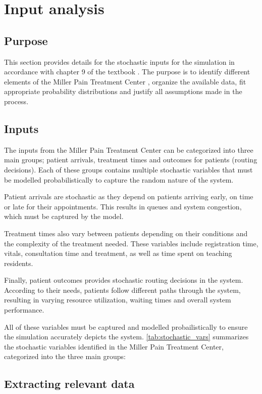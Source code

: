 \section{Input analysis}

\subsection{Purpose}
This section provides details for the stochastic inputs for the simulation in accordance with chapter 9 of the textbook \parencite{pensumbok}. The purpose is to identify different elements of the Miller Pain Treatment Center \parencite{MillerPainTreatmentCenter}, organize the available data, fit appropriate probability distributions and justify all assumptions made in the process.

\subsection{Inputs}
The inputs from the Miller Pain Treatment Center can be categorized into three main groups; patient arrivals, treatment times and outcomes for patients (routing decisions). Each of these groups contains multiple stochastic variables that must be modelled probabilistically to capture the random nature of the system.

Patient arrivals are stochastic as they depend on patients arriving early, on time or late for their appointments. This results in queues and system congestion, which must be captured by the model.

Treatment times also vary between patients depending on their conditions and the complexity of the treatment needed. These variables include registration time, vitals, consultation time and treatment, as well as time spent on teaching residents.

Finally, patient outcomes provides stochastic routing decisions in the system. According to their needs, patients follow different paths through the system, resulting in varying resource utilization, waiting times and overall system performance. 

All of these variables must be captured and modelled probailistically to ensure the simulation accurately depicts the system. \autoref{tab:stochastic_vars} summarizes the stochastic variables identified in the Miller Pain Treatment Center, categorized into the three main groups:



\subsection{Extracting relevant data}

